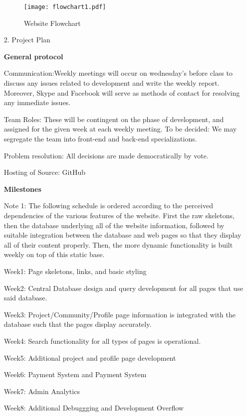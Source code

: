 \documentclass[12pt]{article}
\begin{document}
\begin{enumerate}
\begin{figure}[ht!]
\centering
\texttt{[image: flowchart1.pdf]}
\caption{Website Flowchart \label{overflow}}
\end{figure}


\item[2.] Project Plan

\textbf{General protocol}

Communication:Weekly meetings will occur on wednesday's before class to discuss any issues related to development and write the weekly report. Moreover, Skype and Facebook will serve as methods of contact for resolving any immediate issues.

Team Roles: These will be contingent on the phase of development, and assigned for the given week at each weekly meeting. To be decided: We may segregate the team into front-end and back-end specializations.

Problem resolution: All decisions are made democratically by vote.

Hosting of Source: GitHub

\textbf{Milestones}

Note 1: The following schedule is ordered according to the perceived dependencies of the various features of the website. First the raw skeletons, then the database underlying all of the website information, followed by suitable integration between the database and web pages so that they display all of their content properly. Then, the more dynamic functionality is built weekly on top of this static base. 

Week1: Page skeletons, links, and basic styling

Week2: Central Database design and query development for all pages that use said database.

Week3: Project/Community/Profile page information is integrated with the database such that the pages display accurately.

Week4: Search functionality for all types of pages is operational.

Week5: Additional project and profile page development

Week6: Payment System and Payment System

Week7: Admin Analytics

Week8: Additional Debuggging and Development Overflow


\end{enumerate}
\end{document}
